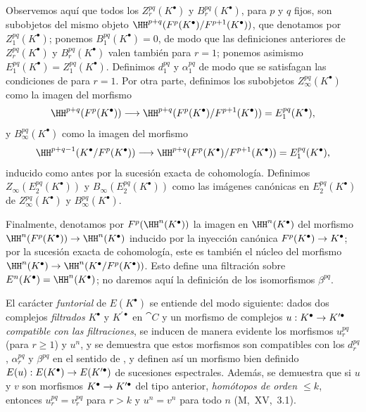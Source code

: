 \documentclass[oneside]{amsart}
\makeatletter
\renewcommand{\leq}{\leqslant}
\renewcommand{\geq}{\geqslant}
\newcommand{\ega@arrow}[2]{\mathchoice{#1}{#2}{#2}{#2}}
\renewcommand{\to}{\ega@arrow{\longrightarrow}{\rightarrow}}
\let\EGAOriginalLabel\label
\renewcommand{\label}[1]{\phantomsection\EGAOriginalLabel{#1}}
\makeatother
\begin{document}
\begin{env}[11.2.2]
Observemos aquí que todos los $Z_r^{pq}(K^\bullet)$ y $B_r^{pq}(K^\bullet)$, para $p$ y $q$ fijos, son subobjetos del mismo objeto $\HH^{p+q}(F^p(K^\bullet)/F^{p+1}(K^\bullet))$, que denotamos por $Z_1^{pq}(K^\bullet)$; ponemos $B_1^{pq}(K^\bullet)=0$, de modo que las definiciones anteriores de $Z_r^{pq}(K^\bullet)$ y $B_r^{pq}(K^\bullet)$ valen también para $r=1$; ponemos asimismo $E_1^{pq}(K^\bullet)=Z_1^{pq}(K^\bullet)$.
Definimos $d_1^{pq}$ y $\alpha_1^{pq}$ de modo que se satisfagan las condiciones de  para $r=1$.
Por otra parte, definimos los subobjetos $Z_\infty^{pq}(K^\bullet)$ como la imagen del morfismo
\[
  \HH^{p+q}(F^p(K^\bullet))\to\HH^{p+q}(F^p(K^\bullet)/F^{p+1}(K^\bullet))=E_1^{pq}(K^\bullet),
\]
y $B_\infty^{pq}(K^\bullet)$ como la imagen del morfismo
\[
  \HH^{p+q-1}(K^\bullet/F^p(K^\bullet))\to\HH^{p+q}(F^p(K^\bullet)/F^{p+1}(K^\bullet))=E_1^{pq}(K^\bullet),
\]
inducido como antes por la sucesión exacta de cohomología.
Definimos $Z_\infty(E_2^{pq}(K^\bullet))$ y $B_\infty(E_2^{pq}(K^\bullet))$ como las imágenes canónicas en $E_2^{pq}(K^\bullet)$ de $Z_\infty^{pq}(K^\bullet)$ y $B_\infty^{pq}(K^\bullet)$.

Finalmente, denotamos por $F^p(\HH^n(K^\bullet))$ la imagen en $\HH^n(K^\bullet)$ del morfismo $\HH^n(F^p(K^\bullet))\to\HH^n(K^\bullet)$ inducido por la inyección canónica $F^p(K^\bullet)\to K^\bullet$; por la sucesión exacta de cohomología, este es también el núcleo del morfismo $\HH^n(K^\bullet)\to\HH^n(K^\bullet/F^p(K^\bullet))$.
Esto define una filtración sobre $E^n(K^\bullet)=\HH^n(K^\bullet)$; no daremos aquí la definición de los isomorfismos $\beta^{pq}$.
\end{env}

\begin{env}[11.2.3]
\label{0.11.2.3}
El carácter \emph{funtorial} de $E(K^\bullet)$ se entiende del modo siguiente: dados dos complejos \emph{filtrados} $K^\bullet$ y $K^{\prime\bullet}$ en $\cat{C}$ y un morfismo de complejos $u:K^\bullet\to K^{\prime\bullet}$ \emph{compatible con las filtraciones}, se inducen de manera evidente los morfismos $u_r^{pq}$ (para $r\geq 1$) y $u^n$, y se demuestra que estos morfismos son compatibles con los $d_r^{pq}$, $\alpha_r^{pq}$ y $\beta^{pq}$ en el sentido de , y definen así un morfismo bien definido $E(u):E(K^\bullet)\to E(K^{\prime\bullet})$ de sucesiones espectrales.
Además, se demuestra que si $u$ y $v$ son morfismos $K^\bullet\to K^{\prime\bullet}$ del tipo anterior, \emph{homótopos de orden $\leq k$}, entonces $u_r^{pq}=v_r^{pq}$ para $r>k$ y $u^n=v^n$ para todo $n$ (M,~XV,~3.1).
\end{env}
\end{document}
